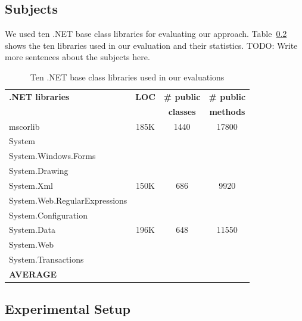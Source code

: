 \subsection{Subjects}

We used ten .NET base class libraries for evaluating our approach. Table~\ref{} shows
the ten libraries used in our evaluation and their statistics. TODO: Write more sentences
about the subjects here.

\setlength{\tabcolsep}{1pt}
\begin{table}[t]
\begin{SmallOut}
\begin{CodeOut}
\begin{center}
\begin {tabular} {|l|c|c|c|}
\hline
\textbf{.NET libraries} & \textbf{LOC} & \textbf{\# public} & \textbf{\# public}\\ 
 & & \textbf{classes} & \textbf{methods}\\ 
\hline
\hline  mscorlib & 185K & 1440 & 17800 \\
\hline  System &  & & \\
\hline  System.Windows.Forms & & & \\
\hline  System.Drawing & & & \\
\hline  System.Xml & 150K & 686 & 9920 \\
\hline  System.Web.RegularExpressions & & & \\
\hline  System.Configuration & & & \\
\hline  System.Data & 196K & 648 & 11550 \\
\hline  System.Web &  & & \\
\hline  System.Transactions & & & \\
\hline \textbf{AVERAGE} &  &  &   \\
\hline
\end{tabular}
\end{center}
\end{CodeOut}
\end{SmallOut}\vspace*{-4ex}
\centering \caption {Ten .NET base class libraries used in our evaluations}
\end{table}

\subsection{Experimental Setup}

